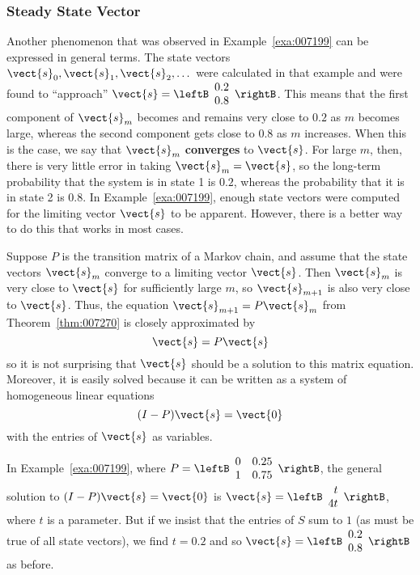 \subsubsection*{Steady State Vector}

\noindent Another phenomenon that was observed in Example~\ref{exa:007199} can be expressed in general terms. The state vectors $\vect{s}_{0}, \vect{s}_{1}, \vect{s}_{2}, \dots$ were calculated in that example and were found to ``approach'' $\vect{s} = \leftB \begin{array}{c}
0.2 \\
0.8
\end{array} \rightB$.
 This means that the first component of $\vect{s}_{m}$ becomes and remains very close to $0.2$ as $m$ becomes large, whereas the second component gets close to $0.8$ as $m$ increases. When this is the case, we say that $\vect{s}_{m}$ \textbf{converges} to $\vect{s}$. For large $m$, then, there is very little error in taking $\vect{s}_{m} = \vect{s}$, so the long-term probability that the system is in state 1 is $0.2$, whereas the probability that it is in state 2 is $0.8$. In Example~\ref{exa:007199}, enough state vectors were computed for the limiting vector $\vect{s}$ to be apparent. However, there is a better way to do this that works in most cases.


Suppose $P$ is the transition matrix of a Markov chain, and assume that the state vectors $\vect{s}_{m}$ converge to a limiting vector $\vect{s}$. Then $\vect{s}_{m}$ is very close to $\vect{s}$ for sufficiently large $m$, so $\vect{s}_{m+1}$ is also very close to $\vect{s}$. Thus, the equation $\vect{s}_{m+1} = P\vect{s}_{m}$ from Theorem~\ref{thm:007270} is closely approximated by
\begin{equation*}
\vect{s} = P\vect{s}
\end{equation*}
so it is not surprising that $\vect{s}$ should be a solution to this matrix equation. Moreover, it is easily solved because it can be written as a system of homogeneous linear equations
\begin{equation*}
(I - P)\vect{s} = \vect{0}
\end{equation*}
with the entries of $\vect{s}$ as variables.


In Example~\ref{exa:007199}, where $P = \leftB \begin{array}{rr}
0 & 0.25 \\
1 & 0.75
\end{array} \rightB$,
 the general solution to $(I - P)\vect{s} = \vect{0}$ is $\vect{s} = \leftB \begin{array}{r}
 t \\
 4t
 \end{array} \rightB$,
 where $t$ is a parameter. But if we insist that the entries of $S$ sum to $1$ (as must be true of all state vectors), we find $t = 0.2$ and so $\vect{s} = \leftB \begin{array}{r}
 0.2 \\
 0.8
 \end{array} \rightB$
 as before.


